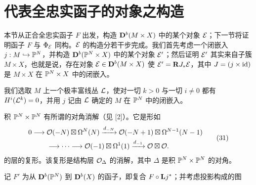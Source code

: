 \section{代表全忠实函子的对象之构造}


本节从正合全忠实函子 $F$ 出发，构造 $\mathbf{D}^{b}(M\times X)$ 中的某个对象 $\mathcal{E}$；下一节将证明函子 $F$ 与 $\Phi_{\mathcal{E}}$ 同构。$\mathcal{E}$ 的构造分若干步完成。我们首先考虑一个闭嵌入 $j:M\hookrightarrow\mathbb{P}^{N}$，并构造 $\mathbf{D}^{b}(\mathbb{P}^{N}\times X)$ 中的某个对象 $\mathcal{E}'$；然后证明 $\mathcal{E}'$ 其实来自子簇 $M\times X$，也就是说，存在对象 $\mathcal{E}\in\mathbf{D}^{b}(M\times X)$ 使 $\mathcal{E}'=\mathbf{R} J_{*}\mathcal{E}$，其中 $J=(j\times\mathrm{id})$ 是 $M\times X$ 在 $\mathbb{P}^{N}\times X$ 中的闭嵌入。

我们选取 $M$ 上一个极丰富线丛 $\mathcal{L}$，使对一切 $k>0$ 与一切 $i\neq0$ 都有 \mbox{$H^{i}(\mathcal{L}^{k})=0$}，并用 $j$ 记由 $\mathcal{L}$ 确定的 $M$ 在 $\mathbb{P}^{N}$ 中的闭嵌入。

积 $\mathbb{P}^{N}\times\mathbb{P}^{N}$ 有所谓的对角消解（见 [2]）。它是形如
\begin{equation}
\begin{aligned}
0\longrightarrow{}&\mathcal{O}(-N)\boxtimes\Omega^{N}(N)\xrightarrow{d_{-N}}\mathcal{O}(-N+1)\boxtimes\Omega^{N-1}(N-1)\\
&\longrightarrow\cdots\longrightarrow\mathcal{O}(-1)\boxtimes\Omega^{1}(1)\xrightarrow{d_{-1}}\mathcal{O}\boxtimes\mathcal{O}.
\end{aligned}
\tag{31}
\end{equation}
的层的复形。该复形是结构层 $\mathcal{O}_{\Delta}$ 的消解，其中 $\Delta$ 是积 $\mathbb{P}^{N}\times\mathbb{P}^{N}$ 的对角。


记 $F'$ 为从 $\mathbf{D}^{b}(\mathbb{P}^{N})$ 到 $\mathbf{D}^{b}(X)$ 的函子，即复合 $F\circ\mathbf{L} j^{*}$；并考虑投影构成的图

